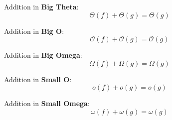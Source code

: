   \begin{corollary} Addition in \textbf{Big Theta}: 
  \[  \Theta(f) + \Theta(g) = \Theta(g)\]
  \end{corollary}
  \begin{corollary} Addition in \textbf{Big O}: 
  \[  \mathcal{O}(f) + \mathcal{O}(g) = \mathcal{O}(g)\]
  \end{corollary}  
  \begin{corollary} Addition in \textbf{Big Omega}: 
  \[  \Omega(f) + \Omega(g) = \Omega(g)\]
  \end{corollary}
  \begin{corollary} Addition in \textbf{Small O}:
  \[  o(f) + o(g) = o(g)\]
  \end{corollary}
  \begin{corollary} Addition in \textbf{Small Omega}:
  \[  \omega(f) + \omega(g) = \omega(g)\]
  \end{corollary}
